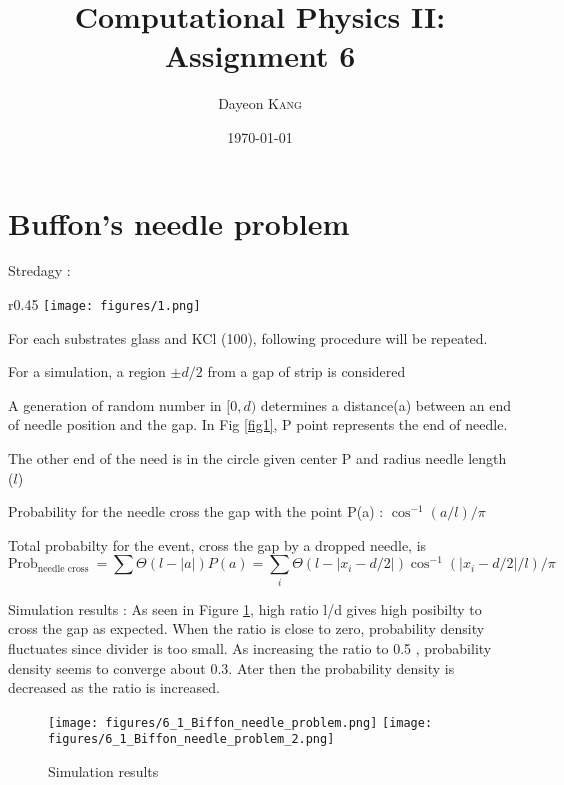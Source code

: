 \documentclass[paper=a4, fontsize=11pt]{scrartcl} %
\title{
	\normalfont \normalsize 
	\LARGE Computational Physics II: Assignment 6 \\ %
  }
\author{\Large Dayeon \textsc{Kang}} %
\date{\normalsize\today} %
\numberwithin{equation}{section} %
\numberwithin{figure}{section} %
\numberwithin{table}{section} %
\begin{document}
\maketitle %

\section{Buffon's needle problem}

Stredagy :   
\begin{itemize}[itemsep=0pt]
  
\item \parbox[t]{\dimexpr\textwidth-\leftmargin}{%
      \vspace{-2.5mm}
      \begin{wrapfigure}{r}{0.45\textwidth}
        \centering
        \vspace{-\baselineskip}
        \texttt{[image: figures/1.png]}
        \caption[]{}
        \label{fig1}
  \end{wrapfigure}

  For each substrates glass and KCl (100), following procedure will be repeated. 

\item For a simulation, a region $\pm d/2$ from a gap of strip is considered
\item A generation of random number in $[0,d)$ determines a distance(a) between an end of needle position and the gap. In Fig \ref{fig1}, P point represents  the end of needle. 
    \item The other end of the need is in the circle given center P and radius needle length ($l$)}
\vspace{0.7em}
    \item Probability for the needle cross the gap with the point  P(a) :  $\cos^{-1}(a/l)/\pi$

    \item Total probabilty for the event, cross the gap  by a dropped needle, is
             \begin{equation}
        \text{Prob}_{\text{needle cross }} = \sum \Theta(l - |a|)P(a) = \sum_{i} \Theta(l - |x_{i}-d/2|)\cos^{-1}(|x_{i}-d/2 |/l)/\pi 
        \end{equation}
      \end{itemize}

      Simulation results :
      As seen in Figure \ref{fig1-2}, high ratio l/d gives high posibilty to cross the gap as expected. When the ratio is close to zero, probability density fluctuates since divider is too small. As increasing the ratio to 0.5 , probability density seems to converge about 0.3. Ater then the probability density is decreased as the ratio is increased.  
  \begin{figure}
    \centering
  \texttt{[image: figures/6\_1\_Biffon\_needle\_problem.png]}
  \texttt{[image: figures/6\_1\_Biffon\_needle\_problem\_2.png]}
   \caption{Simulation results}
   \label{fig1-2}
\end{figure}
      
\end{document}
